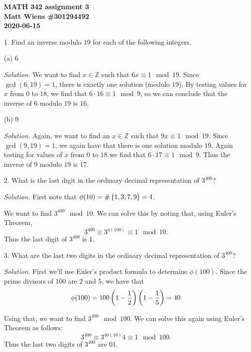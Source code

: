\documentclass{article}
\newcommand{\Z}{\mathbb{Z}}
\begin{document}
\textbf{MATH 342 assignment 3} \\
\textbf{Matt Wiens \#301294492} \\
\textbf{2020-06-15}

1. Find an inverse modulo $19$ for each of the following integers.

(a) 6

\textit{Solution.}
We want to find $x \in \Z$ such that $6 x \equiv 1 \mod 19$. Since
$\gcd(6, 19) = 1$, there is exactly one solution (modulo $19$).
By testing values for $x$ from $0$ to $18$, we find that
$6 \cdot 16 \equiv 1 \mod 9$, so we can conclude that the inverse
of $6$ modulo $19$ is $16$.

\vspace{5mm}

(b) 9

\textit{Solution.}
Again, we want to find an $x \in \Z$ such that $9 x \equiv 1 \mod 19$.
Since $\gcd(9, 19) = 1$, we again have that there is one solution modulo
$19$. Again testing for values of $x$ from $0$ to $18$ we find that $6
\cdot 17 \equiv 1 \mod 9$. Thus the inverse of $9$ modulo $19$ is $17$.


\newpage

2. What is the last digit in the ordinary decimal representation of
$3^{400}$?

\textit{Solution.}
First note that $\phi(10) = \#\cbr{1, 3, 7, 9} = 4$.

We want to find $3^{400} \mod 10$. We can solve this by noting that,
using Euler's Theorem,
%
\begin{equation*}
    3^{400} \equiv 3^{4 (100)} \equiv 1 \mod 10
    .
\end{equation*}
%
Thus the last digit of $3^{400}$ is $1$.

\newpage

3. What are the last two digits in the ordinary decimal representation
of $3^{400}$?

\textit{Solution.}
First we'll use Euler's product formula to determine $\phi(100)$.
Since the prime divisors of $100$ are $2$ and $5$, we have that
%
\begin{equation*}
    \phi(100) = 100 \del{1 - \frac{1}{2}} \del{1 - \frac{1}{5}} = 40
\end{equation*}

Using that, we want to find $3^{400} \mod 100$. We can solve this again
using Euler's Theorem as follows:
%
\begin{equation*}
    3^{400} \equiv 3^{40 (10)} 4 \equiv 1 \mod 100
    .
\end{equation*}
%
Thus the last two digits of $3^{400}$ are $01$.
\end{document}
